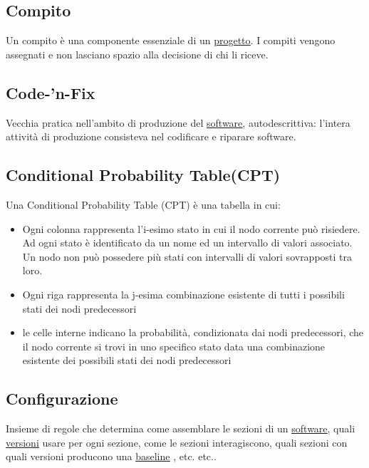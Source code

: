 	\subsection{Compito}
	\label{sec:compiti}
	Un compito è una componente essenziale di un \underline{\hyperref[sec:progetto]{progetto}}. I compiti vengono assegnati e non lasciano spazio alla decisione di chi li riceve.

	\subsection{Code-'n-Fix}
	\label{sec:codenfix}
	Vecchia pratica nell'ambito di produzione del \underline{\hyperref[sec:prodottosoftware]{software}}, autodescrittiva: l'intera attività di produzione consisteva nel codificare e riparare software.

	\subsection{Conditional Probability Table(CPT)}
	\label{sec:CPT}
	Una Conditional Probability Table (CPT) è una tabella in cui:
		\begin{itemize}
			\item{Ogni colonna rappresenta l'i-esimo stato in cui il nodo corrente può risiedere. Ad ogni stato è identificato da un nome ed un intervallo di valori associato. Un nodo non può possedere più stati con intervalli di valori sovrapposti tra loro.}
			\item{Ogni riga rappresenta la j-esima combinazione esistente di tutti i possibili stati dei nodi predecessori}
			\item{le celle interne indicano la probabilità, condizionata dai nodi predecessori, che il nodo corrente si trovi in uno specifico stato data una combinazione esistente dei possibili stati dei nodi predecessori}
		\end{itemize}

	\subsection{Configurazione}
	\label{sec:configurazione}
	Insieme di regole che determina come assemblare le sezioni di un \underline{\hyperref[sec:prodottosoftware]{software}}, quali \underline{\hyperref[sec:versione]{versioni}} usare per ogni sezione, come le sezioni interagiscono, quali sezioni con quali versioni producono una \underline{\hyperref[sec:baseline]{baseline}} , etc. etc..

